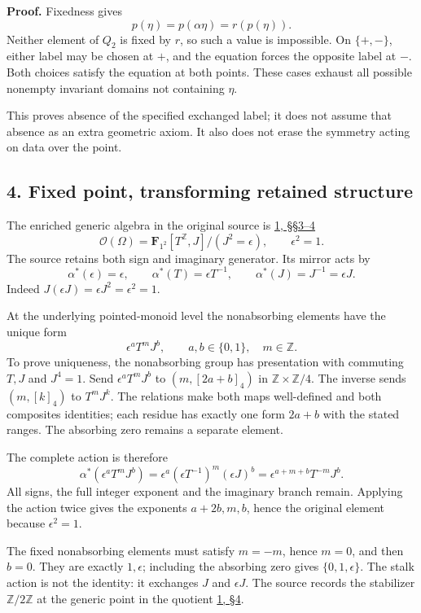 \documentclass[
]{article}
\newcounter{none} %
\begin{document}
\textbf{Proof.} Fixedness gives \[
p(\eta)=p(\alpha\eta)=r(p(\eta)).
\] Neither element of \(Q_2\) is fixed by \(r\), so such a value is
impossible. On \(\{+,-\}\), either label may be chosen at \(+\), and the
equation forces the opposite label at \(-\). Both choices satisfy the
equation at both points. These cases exhaust all possible nonempty
invariant domains not containing \(\eta\).

This proves absence of the specified exchanged label; it does not assume
that absence as an extra geometric axiom. It also does not erase the
symmetry acting on data over the point.

\subsection{4. Fixed point, transforming retained
structure}\label{fixed-point-transforming-retained-structure}

The enriched generic algebra in the original source is
\href{https://arxiv.org/html/2609.00299v1\#S3}{1, §§3--4} \[
\mathcal O(\Omega)
=\mathbf F_{1^2}[T^{\mathbb Z},J]/(J^2=\epsilon),
\qquad \epsilon^2=1.
\] The source retains both sign and imaginary generator. Its mirror acts
by \[
\alpha^*(\epsilon)=\epsilon,\qquad
\alpha^*(T)=\epsilon T^{-1},\qquad
\alpha^*(J)=J^{-1}=\epsilon J.
\] Indeed \(J(\epsilon J)=\epsilon J^2=\epsilon^2=1\).

At the underlying pointed-monoid level the nonabsorbing elements have
the unique form \[
\epsilon^aT^mJ^b,
\qquad a,b\in\{0,1\},\quad m\in\mathbb Z.
\] To prove uniqueness, the nonabsorbing group has presentation with
commuting \(T,J\) and \(J^4=1\). Send \(\epsilon^aT^mJ^b\) to
\((m,[2a+b]_4)\) in \(\mathbb Z\times\mathbb Z/4\). The inverse sends
\((m,[k]_4)\) to \(T^mJ^k\). The relations make both maps well-defined
and both composites identities; each residue has exactly one form
\(2a+b\) with the stated ranges. The absorbing zero remains a separate
element.

The complete action is therefore \[
\boxed{
\alpha^*(\epsilon^aT^mJ^b)
=\epsilon^a(\epsilon T^{-1})^m(\epsilon J)^b
=\epsilon^{a+m+b}T^{-m}J^b.
}
\] All signs, the full integer exponent and the imaginary branch remain.
Applying the action twice gives the exponents \(a+2b,m,b\), hence the
original element because \(\epsilon^2=1\).

The fixed nonabsorbing elements must satisfy \(m=-m\), hence \(m=0\),
and then \(b=0\). They are exactly \(1,\epsilon\); including the
absorbing zero gives \(\{0,1,\epsilon\}\). The stalk action is not the
identity: it exchanges \(J\) and \(\epsilon J\). The source records the
stabilizer \(\mathbb Z/2\mathbb Z\) at the generic point in the quotient
\href{https://arxiv.org/html/2609.00299v1\#S4}{1, §4}.
\end{document}
